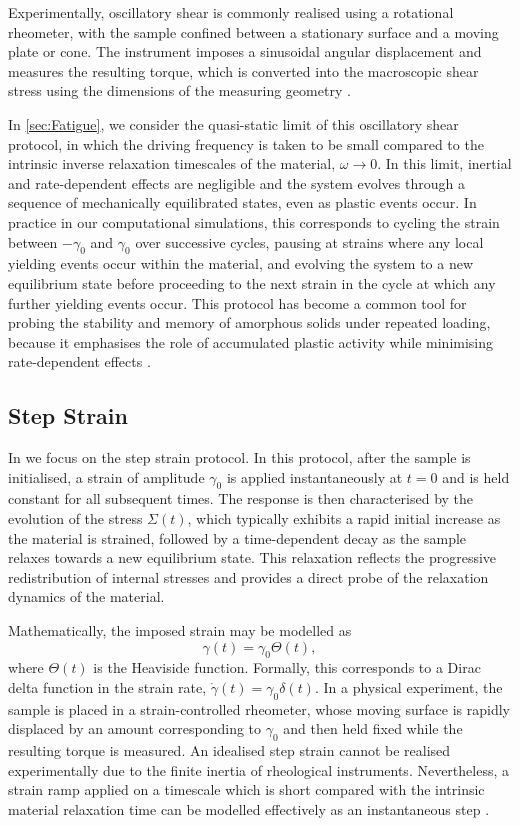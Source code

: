 Experimentally, oscillatory shear is commonly realised using a rotational rheometer, with the sample confined between a stationary surface and a moving plate or cone. The instrument imposes a sinusoidal angular displacement and measures the resulting torque, which is converted into the macroscopic shear stress using the dimensions of the measuring geometry \cite{macoskoRheologyPrinciplesMeasurements1994}.

In \cref{sec:Fatigue}, we consider the quasi-static limit of this oscillatory shear protocol, in which the driving frequency is taken to be small compared to the intrinsic inverse relaxation timescales of the material, $\omega \to 0$. In this limit, inertial and rate-dependent effects are negligible and the system evolves through a sequence of mechanically equilibrated states, even as plastic events occur. In practice in our computational simulations, this corresponds to cycling the strain between $-\gamma_0$ and $\gamma_0$ over successive cycles, pausing at strains where any local yielding events occur within the material, and evolving the system to a new equilibrium state before proceeding to the next strain in the cycle at which any further yielding events occur. This protocol has become a common tool for probing the stability and memory of amorphous solids under repeated loading, because it emphasises the role of accumulated plastic activity while minimising rate-dependent effects \cite{liuFateShearoscillatedAmorphous2022,Leishangthem2017,Fiocco_memory_2014,Regev_onset_2013}.

\subsection{Step Strain} \label{sec:StepStrain}
In  we focus on the step strain protocol. In this protocol, after the sample is initialised, a strain of amplitude $\gamma_0$ is applied instantaneously at $t=0$ and is held constant for all subsequent times. The response is then characterised by the evolution of the stress $\Sigma(t)$, which typically exhibits a rapid initial increase as the material is strained, followed by a time-dependent decay as the sample relaxes towards a new equilibrium state. This relaxation reflects the progressive redistribution of internal stresses and provides a direct probe of the relaxation dynamics of the material.

Mathematically, the imposed strain may be modelled as
\[
    \gamma(t) = \gamma_0 \Theta(t),
\]
where $\Theta(t)$ is the Heaviside function. Formally, this corresponds to a Dirac delta function in the strain rate, $\dot{\gamma}(t) = \gamma_0 \delta(t)$. In a physical experiment, the sample is placed in a strain-controlled rheometer, whose moving surface is rapidly displaced by an amount corresponding to $\gamma_0$ and then held fixed while the resulting torque is measured. An idealised step strain cannot be realised experimentally due to the finite inertia of rheological instruments. Nevertheless, a strain ramp applied on a timescale which is short compared with the intrinsic material relaxation time can be modelled effectively as an instantaneous step \cite{Fang_inhomogeneity_2011}.

